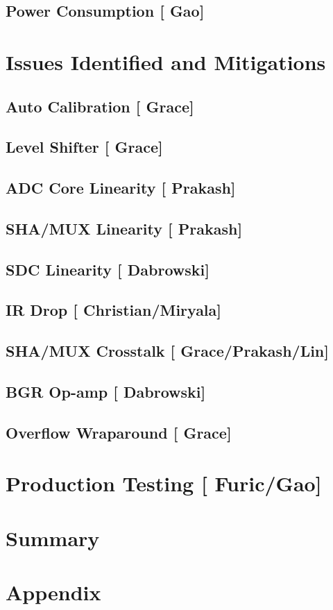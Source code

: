 \documentclass[10pt]{article}
\begin{document}
\subsection{Power Consumption [{\color{red} Gao}] }



\section{Issues Identified and Mitigations}

\subsection{Auto Calibration [{\color{red} Grace}] }

\subsection{Level Shifter  [{\color{red} Grace}] }

\subsection{ADC Core Linearity  [{\color{red} Prakash}] }

\subsection{SHA/MUX Linearity  [{\color{red} Prakash}] }

\clearpage
\newpage
\subsection{SDC Linearity  [{\color{red} Dabrowski}] }

\subsection{IR Drop [{\color{red} Christian/Miryala}] }

\subsection{SHA/MUX Crosstalk [{\color{red} Grace/Prakash/Lin}] }

\subsection{BGR Op-amp	 [{\color{red} Dabrowski}] }

\subsection{Overflow Wraparound  [{\color{red} Grace}] }


\section{Production Testing   [{\color{red} Furic/Gao}] }


\section{Summary}  
%	

\newpage



\newpage
\section*{Appendix}

\end{document}

